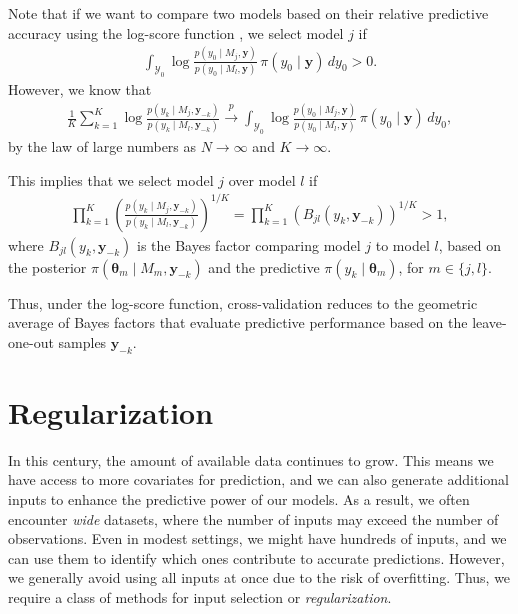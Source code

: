 Note that if we want to compare two models based on their relative predictive accuracy using the log-score function \cite{martin2022optimal}, we select model \( j \) if
\begin{align*}
	\int_{\mathcal{Y}_0} \log\frac{p(y_0 \mid M_j, \mathbf{y})}{p(y_0 \mid M_l, \mathbf{y})} \, \pi(y_0 \mid \mathbf{y}) \, dy_0 > 0.
\end{align*}
However, we know that
\begin{align*}
	\frac{1}{K}\sum_{k=1}^K\log\frac{p(y_k \mid M_j, \mathbf{y}_{-k})}{p(y_k \mid M_l, \mathbf{y}_{-k})} 
	\stackrel{p}{\rightarrow} \int_{\mathcal{Y}_0} \log\frac{p(y_0 \mid M_j, \mathbf{y})}{p(y_0 \mid M_l, \mathbf{y})} \, \pi(y_0 \mid \mathbf{y}) \, dy_0,
\end{align*}
by the law of large numbers as \( N \to \infty \) and \( K \to \infty \).

This implies that we select model \( j \) over model \( l \) if
\begin{align*}
	\prod_{k=1}^K \left( \frac{p(y_k \mid M_j, \mathbf{y}_{-k})}{p(y_k \mid M_l, \mathbf{y}_{-k})} \right)^{1/K} 
	= \prod_{k=1}^K \left( B_{jl}(y_k, \mathbf{y}_{-k}) \right)^{1/K} > 1,
\end{align*}
where \( B_{jl}(y_k, \mathbf{y}_{-k}) \) is the Bayes factor comparing model \( j \) to model \( l \), based on the posterior \( \pi(\boldsymbol{\theta}_m \mid M_m, \mathbf{y}_{-k}) \) and the predictive \( \pi(y_k \mid \boldsymbol{\theta}_m) \), for \( m \in \{j, l\} \).

Thus, under the log-score function, cross-validation reduces to the geometric average of Bayes factors that evaluate predictive performance based on the leave-one-out samples \( \mathbf{y}_{-k} \).

\section{Regularization}\label{sec13_2}

In this century, the amount of available data continues to grow. This means we have access to more covariates for prediction, and we can also generate additional inputs to enhance the predictive power of our models. As a result, we often encounter \textit{wide} datasets, where the number of inputs may exceed the number of observations. Even in modest settings, we might have hundreds of inputs, and we can use them to identify which ones contribute to accurate predictions. However, we generally avoid using all inputs at once due to the risk of overfitting. Thus, we require a class of methods for input selection or \textit{regularization}.

